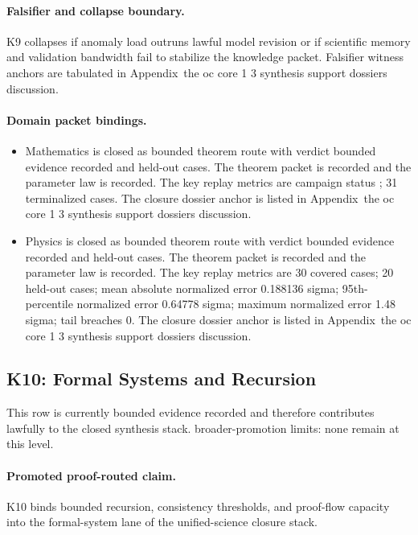 \paragraph{Falsifier and collapse boundary.}
K9 collapses if anomaly load outruns lawful model revision or if scientific memory and validation bandwidth fail to stabilize the knowledge packet.
Falsifier witness anchors are tabulated in Appendix~the oc core 1 3 synthesis support dossiers discussion.

\paragraph{Domain packet bindings.}
\begin{itemize}[leftmargin=1.6em,nosep]
\item Mathematics is closed as bounded theorem route with verdict bounded evidence recorded and  held-out cases. The theorem packet is recorded and the parameter law is recorded. The key replay metrics are campaign status ; 31 terminalized cases. The closure dossier anchor is listed in Appendix~the oc core 1 3 synthesis support dossiers discussion.
\item Physics is closed as bounded theorem route with verdict bounded evidence recorded and  held-out cases. The theorem packet is recorded and the parameter law is recorded. The key replay metrics are 30 covered cases; 20 held-out cases; mean absolute normalized error 0.188136 sigma; 95th-percentile normalized error 0.64778 sigma; maximum normalized error 1.48 sigma; tail breaches 0. The closure dossier anchor is listed in Appendix~the oc core 1 3 synthesis support dossiers discussion.
\end{itemize}

\subsection{K10: Formal Systems and Recursion}
\label{sec:oc-core-1-3-synthesis-k10}
This row is currently bounded evidence recorded and therefore contributes lawfully to the closed synthesis stack.
broader-promotion limits: none remain at this level.

\paragraph{Promoted proof-routed claim.}
K10 binds bounded recursion, consistency thresholds, and proof-flow capacity into the formal-system lane of the unified-science closure stack.

